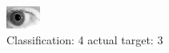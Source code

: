 \begin{figure}[h!]
\begin{center}
\includegraphics[width=0.60\columnwidth]{figures/ID269_class_4_target_3.png}
\end{center}
\caption{ Classification: 4 actual target: 3}
\label{fig:ID269_class_4_target_3}
\end{figure}
